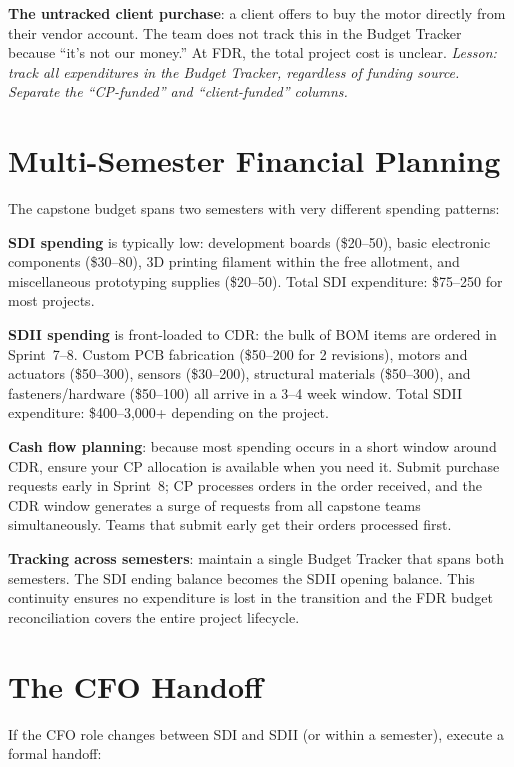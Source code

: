 \textbf{The untracked client purchase}: a client offers to buy the motor directly from their vendor account. The team does not track this in the Budget Tracker because ``it's not our money.'' At FDR, the total project cost is unclear. \emph{Lesson: track all expenditures in the Budget Tracker, regardless of funding source. Separate the ``CP-funded'' and ``client-funded'' columns.}



\section{Multi-Semester Financial Planning}
The capstone budget spans two semesters with very different spending patterns:

\textbf{SDI spending} is typically low: development boards (\$20--50), basic electronic components (\$30--80), 3D printing filament within the free allotment, and miscellaneous prototyping supplies (\$20--50). Total SDI expenditure: \$75--250 for most projects.

\textbf{SDII spending} is front-loaded to CDR: the bulk of BOM items are ordered in Sprint~7--8. Custom PCB fabrication (\$50--200 for 2 revisions), motors and actuators (\$50--300), sensors (\$30--200), structural materials (\$50--300), and fasteners/hardware (\$50--100) all arrive in a 3--4 week window. Total SDII expenditure: \$400--3,000+ depending on the project.

\textbf{Cash flow planning}: because most spending occurs in a short window around CDR, ensure your CP allocation is available when you need it. Submit purchase requests early in Sprint~8; CP processes orders in the order received, and the CDR window generates a surge of requests from all capstone teams simultaneously. Teams that submit early get their orders processed first.

\textbf{Tracking across semesters}: maintain a single Budget Tracker that spans both semesters. The SDI ending balance becomes the SDII opening balance. This continuity ensures no expenditure is lost in the transition and the FDR budget reconciliation covers the entire project lifecycle.

\section{The CFO Handoff}
If the CFO role changes between SDI and SDII (or within a semester), execute a formal handoff:

